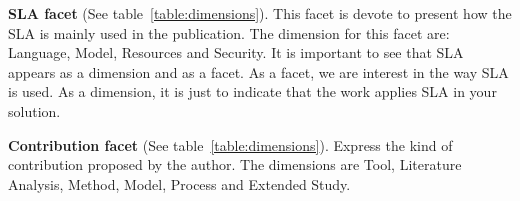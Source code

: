 \textbf{SLA facet} (See table~\ref{table:dimensions}).
This facet is devote to present how the SLA is mainly used in the publication. 
The dimension for this facet are: Language, Model, Resources and Security.
It is important to see that SLA appears as a dimension and as a facet.
As a facet, we are interest in the way SLA is used. 
As a dimension, it is just to indicate that the work
applies SLA in your solution.

\textbf{Contribution facet} (See table~\ref{table:dimensions}).
Express the kind of contribution proposed by the author. 
The dimensions are Tool, Literature Analysis, Method, Model, Process and Extended Study.

